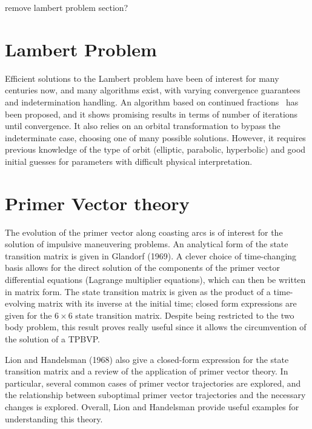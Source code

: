 remove lambert problem section?

\section{Lambert Problem}

Efficient solutions to the Lambert problem have been of interest for many centuries now, and many algorithms exist, with varying convergence guarantees and indetermination handling. An algorithm based on continued fractions~\cite{battin_vaughan_elegant_lambert} has been proposed, and it shows promising results in terms of number of iterations until convergence. It also relies on an orbital transformation to bypass the indeterminate case, choosing one of many possible solutions. However, it requires previous knowledge of the type of orbit (elliptic, parabolic, hyperbolic) and good initial guesses for parameters with difficult physical interpretation. 

\section{Primer Vector theory}

The evolution of the primer vector along coasting arcs is of interest for the solution of impulsive maneuvering problems. An analytical form of the state transition matrix is given in Glandorf (1969). A clever choice of time-changing basis allows for the direct solution of the components of the primer vector differential equations (Lagrange multiplier equations), which can then be written in matrix form. The state transition matrix is given as the product of a time-evolving matrix with its inverse at the initial time; closed form expressions are given for the \(6\times6\) state transition matrix. Despite being restricted to the two body problem, this result proves really useful since it allows the circumvention of the solution of a TPBVP.

Lion and Handelsman (1968) also give a closed-form expression for the state transition matrix and a review of the application of primer vector theory. In particular, several common cases of primer vector trajectories are explored, and the relationship between suboptimal primer vector trajectories and the necessary changes is explored. Overall, Lion and Handelsman provide useful examples for understanding this theory. 

